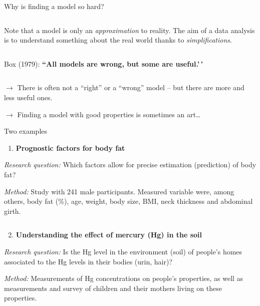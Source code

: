 \documentclass[
  10pt,
  ignorenonframetext,
]{beamer}
\providecommand{\tightlist}{%
  \setlength{\itemsep}{0pt}\setlength{\parskip}{0pt}}
\begin{document}
\begin{frame}
Why is finding a model so hard?

\(~\)

Note that a model is only an \emph{approximation} to reality. The aim of
a data analysis is to understand something about the real world thanks
to \emph{simplifications}.

\(~\)

Box (1979): \textbf{``All models are wrong, but some are useful.'\,'}

\(~\)

\(\rightarrow\) There is often not a ``right'' or a ``wrong'' model --
but there are more and less useful ones.

\(\rightarrow\) Finding a model with good properties is sometimes an
art\ldots{}
\end{frame}

\begin{frame}
\begin{block}{Two examples}
\protect\hypertarget{two-examples}{}
\(~\)

\begin{enumerate}
\tightlist
\item
  \textbf{Prognostic factors for body fat}
\end{enumerate}

\vspace{1mm}

\emph{Research question:} Which factors allow for precise estimation
(prediction) of body fat?

\vspace{1mm}

\emph{Method:} Study with 241 male participants. Measured variable were,
among others, body fat (\%), age, weight, body size, BMI, neck thickness
and abdominal girth.

\(~\)

\begin{enumerate}
\setcounter{enumi}{1}
\tightlist
\item
  \textbf{Understanding the effect of mercury (Hg) in the soil}
\end{enumerate}

\vspace{1mm}

\emph{Research question:} Is the Hg level in the environment (soil) of
people's homes associated to the Hg levels in their bodies (urin, hair)?

\vspace{1mm}

\emph{Method:} Measurements of Hg concentrations on people's properties,
as well as measurements and survey of children and their mothers living
on these properties.
\end{block}
\end{frame}
\end{document}
